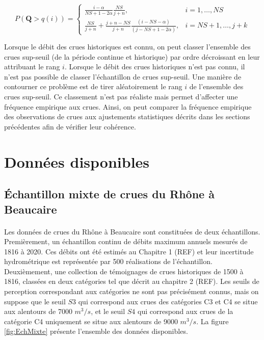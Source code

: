 \documentclass[11pt]{article}
\begin{document}
		\begin{equation}	
		P(\boldsymbol{Q} > q(i)) = \begin{cases}\frac{i-\alpha}{NS+1-2 \alpha} \frac{NS}{j+n}, & i=1, \ldots, NS \\ \frac{NS}{j+n}+\frac{j+n-NS}{j+n} \frac{(i-NS-\alpha)}{(j-NS+1-2\alpha)}, & i=NS+1, \ldots, j+k\end{cases}
		\label{eq:FreqHisto}	
		\end{equation}
	
	Lorsque le débit des crues historiques est connu, on peut classer l'ensemble des crues sup-seuil (de la période continue et historique) par ordre décroissant en leur attribuant le rang $i$. Lorsque le débit des crues historiques n'est pas connu, il n'est pas possible de classer l'échantillon de crues sup-seuil. Une manière de contourner ce problème est de tirer aléatoirement le rang $i$ de l'ensemble des crues sup-seuil. Ce classement n'est pas réaliste mais permet d'affecter une fréquence empirique aux crues. Ainsi, on peut comparer la fréquence empirique des observations de crues aux ajustements statistiques décrits dans les sections précédentes afin de vérifier leur cohérence. 
		
\section{Données disponibles}

	\subsection{Échantillon mixte de crues du Rhône à Beaucaire}
	\paragraph{} Les données de crues du Rhône à Beaucaire sont constituées de deux échantillons. \\
	Premièrement, un échantillon continu de débits maximum annuels mesurés de 1816 à 2020. Ces débits ont été estimés au Chapitre 1 (REF) et leur incertitude hydrométrique est représentée par 500 réalisations de l'échantillon. \\
	Deuxièmement, une collection de témoignages de crues historiques de 1500 à 1816, classées en deux catégories tel que décrit au chapitre 2 (REF). Les seuils de perception correspondant aux catégories ne sont pas précisément connus, mais on suppose que le seuil $S3$ qui correspond aux crues des catégories C3 et C4 se situe aux alentours de 7000 $m^3/s$, et le seuil $S4$ qui correspond aux crues de la catégorie C4 uniquement se situe aux alentours de 9000 $m^3/s$. La figure \ref{fig:EchMixte} présente l'ensemble des données disponibles. 
	
\end{document}
